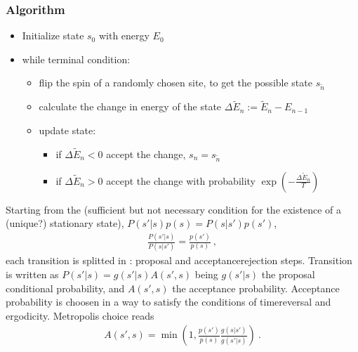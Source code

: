\documentclass[letterpaper,10pt,english]{jupyterBook}
\begin{document}
\subsubsection*{Algorithm}
\begin{itemize}
\item {} 
\sphinxAtStartPar
Initialize state \(s_0\) with energy \(E_0\)

\item {} 
\sphinxAtStartPar
while  terminal condition:
\begin{itemize}
\item {} 
\sphinxAtStartPar
flip the spin of a randomly chosen site, to get the possible state \(s_{\widetilde{n}}\)

\item {} 
\sphinxAtStartPar
calculate the change in energy of the state \(\Delta \widetilde{E}_n := \widetilde{E}_n - E_{n-1}\)

\item {} 
\sphinxAtStartPar
update state:
\begin{itemize}
\item {} 
\sphinxAtStartPar
if \(\Delta \widetilde{E}_n < 0\) accept the change, \(s_n = s_{\widetilde{n}}\)

\item {} 
\sphinxAtStartPar
if \(\Delta \widetilde{E}_n > 0\) accept the change with probability \(\exp\left( - \frac{\Delta \widetilde{E}_n}{T} \right)\)

\end{itemize}

\end{itemize}

\end{itemize}

\sphinxAtStartPar
Starting from the  (sufficient but not necessary condition for the existence of a (unique?) stationary state), \(P(s'|s) p(s) = P(s|s') p(s')\),
\begin{equation*}
\begin{split}\frac{P(s'|s)}{P(s|s')} = \frac{p(s')}{p(s)} \ ,\end{split}
\end{equation*}
\sphinxAtStartPar
each transition is splitted in : proposal and acceptance\sphinxhyphen{}rejection steps. Transition is written as \(P(s'|s) = g(s'|s) A(s',s)\) being \(g(s'|s)\) the proposal conditional probability, and \(A(s',s)\) the acceptance probability. Acceptance probability is choosen in a way to satisfy the conditions of time\sphinxhyphen{}reversal and ergodicity. Metropolis choice reads
\begin{equation*}
\begin{split}A(s', s) = \min \left( 1, \frac{p(s')}{p(s)} \frac{g(s|s')}{g(s'|s)} \right) \ .\end{split}
\end{equation*}
\sphinxAtStartPar
{} 
\end{document}
